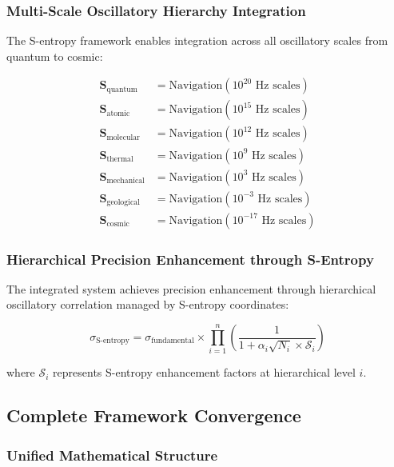 \documentclass[12pt,a4paper]{article}
\begin{document}
{{{{{{{{{{{{{{\subsubsection{Multi-Scale Oscillatory Hierarchy Integration}

The S-entropy framework enables integration across all oscillatory scales from quantum to cosmic:

\begin{align}
\mathbf{S}_{\text{quantum}} &= \text{Navigation}(10^{20} \text{ Hz scales}) \\
\mathbf{S}_{\text{atomic}} &= \text{Navigation}(10^{15} \text{ Hz scales}) \\
\mathbf{S}_{\text{molecular}} &= \text{Navigation}(10^{12} \text{ Hz scales}) \\
\mathbf{S}_{\text{thermal}} &= \text{Navigation}(10^{9} \text{ Hz scales}) \\
\mathbf{S}_{\text{mechanical}} &= \text{Navigation}(10^{3} \text{ Hz scales}) \\
\mathbf{S}_{\text{geological}} &= \text{Navigation}(10^{-3} \text{ Hz scales}) \\
\mathbf{S}_{\text{cosmic}} &= \text{Navigation}(10^{-17} \text{ Hz scales})
\end{align}

\subsubsection{Hierarchical Precision Enhancement through S-Entropy}

The integrated system achieves precision enhancement through hierarchical oscillatory correlation managed by S-entropy coordinates:

$$\sigma_{\text{S-entropy}} = \sigma_{\text{fundamental}} \times \prod_{i=1}^{n}\left(\frac{1}{1 + \alpha_i\sqrt{N_i} \times \mathcal{S}_i}\right)$$

where $\mathcal{S}_i$ represents S-entropy enhancement factors at hierarchical level $i$.

\subsection{Complete Framework Convergence}

\subsubsection{Unified Mathematical Structure}

}}}}}}}}}}}}}}
\end{document}
